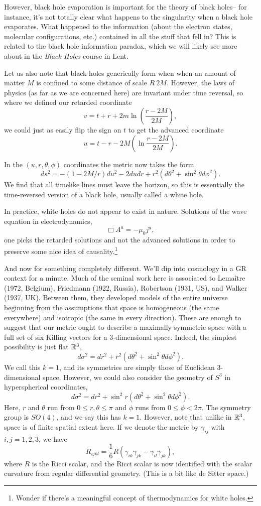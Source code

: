 However, black hole evaporation is important for the theory of black holes-- for instance, it's not totally clear what happens to the singularity when a black hole evaporates. What happened to the information (about the electron states, molecular configurations, etc.) contained in all the stuff that fell in? This is related to the black hole information paradox, which we will likely see more about in the \emph{Black Holes} course in Lent.

Let us also note that black holes generically form when when an amount of matter $M$ is confined to some distance of scale $R~2M$. However, the laws of physics (as far as we are concerned here) are invariant under time reversal, so where we defined our retarded coordinate
$$v=t+r+2m\ln (\frac{r-2M}{2M}),$$
we could just as easily flip the sign on $t$ to get the advanced coordinate
$$u=t-r-2M(\ln \frac{r-2M}{2M}).$$

In the $(u,r,\theta,\phi)$ coordinates the metric now takes the form 
$$ds^2=-(1-2M/r)du^2-2dudr +r^2(d\theta^2 +\sin^2\theta d\phi^2).$$
We find that all timelike lines must leave the horizon, so this is essentially the time-reversed version of a black hole, usually called a white hole.

In practice, white holes do not appear to exist in nature. Solutions of the wave equation in electrodynamics,
$$\Box A^a=-\mu_0 j^a,$$
one picks the retarded solutions and not the advanced solutions in order to preserve some nice idea of causality.\footnote{Wonder if there's a meaningful concept of thermodynamics for white holes.}

And now for something completely different. We'll dip into cosmology in a GR context for a minute. Much of the seminal work here is associated to Lema\^itre (1972, Belgium), Friedmann (1922, Russia), Robertson (1931, US), and Walker (1937, UK). Between them, they developed models of the entire universe beginning from the assumptions that space is homogeneous (the same everywhere) and isotropic (the same in every direction). These are enough to suggest that our metric ought to describe a maximally symmetric space with a full set of six Killing vectors for a 3-dimensional space. Indeed, the simplest possibility is just flat $\mathbb{R}^3$,
$$d\sigma^2=dr^2+r^2(d\theta^2+\sin^2\theta d\phi^2).$$
We call this $k=1$, and its symmetries are simply those of Euclidean 3-dimensional space. However, we could also consider the geometry of $S^3$ in hyperspherical coordinates,
$$d\sigma^2=dr^2+\sin^2 r(d\theta^2+\sin^2\theta d\phi^2).$$ Here, $r$ and $\theta$ run from $0\leq r,\theta\leq \pi$ and $\phi$ runs from $0\leq \phi < 2\pi$. The symmetry group is $SO(4)$, and we say this has $k=1$. However, note that unlike in $\mathbb{R}^3$, space is of finite spatial extent here. If we denote the metric by $\gamma_{ij}$ with $i,j=1,2,3$, we have
$$R_{ijkl}=\frac{1}{6}R(\gamma_{ik}\gamma_{jk}-\gamma_{il}\gamma_{jk}),$$
where $R$ is the Ricci scalar, and the Ricci scalar is now identified with the scalar curvature from regular differential geometry. (This is a bit like de Sitter space.)

